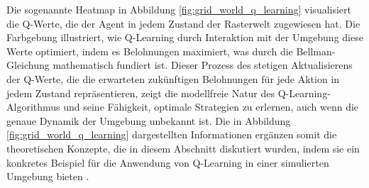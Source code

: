 Die sogenannte Heatmap in Abbildung \ref{fig:grid_world_q_learning} visualisiert die Q-Werte, die der Agent in jedem Zustand der Rasterwelt zugewiesen hat. Die Farbgebung illustriert, wie Q-Learning durch Interaktion mit der Umgebung diese Werte optimiert, indem es Belohnungen maximiert, was durch die Bellman-Gleichung mathematisch fundiert ist. Dieser Prozess des stetigen Aktualisierens der Q-Werte, die die erwarteten zukünftigen Belohnungen für jede Aktion in jedem Zustand repräsentieren, zeigt die modellfreie Natur des Q-Learning-Algorithmus und seine Fähigkeit, optimale Strategien zu erlernen, auch wenn die genaue Dynamik der Umgebung unbekannt ist. Die in Abbildung \ref{fig:grid_world_q_learning} dargestellten Informationen ergänzen somit die theoretischen Konzepte, die in diesem Abschnitt diskutiert wurden, indem sie ein konkretes Beispiel für die Anwendung von Q-Learning in einer simulierten Umgebung bieten \cite{klein_abbeel_cs188}.
%
%
